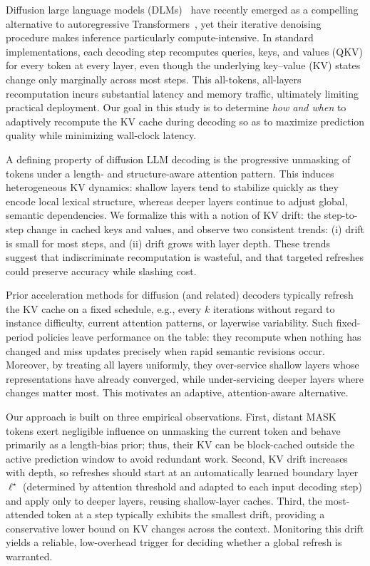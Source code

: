 \documentclass{article} %
\theoremstyle{definition}
\theoremstyle{remark}
\begin{document}
Diffusion large language models (DLMs)~\citep{li2025survey} have recently emerged as a compelling alternative to autoregressive Transformers~\citep{radford2018improving,achiam2023gpt}, yet their iterative denoising procedure makes inference particularly compute-intensive. In standard implementations, each decoding step recomputes queries, keys, and values (QKV) for every token at every layer, even though the underlying key–value (KV) states change only marginally across most steps. This all-tokens, all-layers recomputation incurs substantial latency and memory traffic, ultimately limiting practical deployment. Our goal in this study is to determine {\em how and when} to adaptively recompute the KV cache during decoding so as to maximize prediction quality while minimizing wall-clock latency.

A defining property of diffusion LLM decoding is the progressive unmasking of tokens under a length- and structure-aware attention pattern. This induces heterogeneous KV dynamics: shallow layers tend to stabilize quickly as they encode local lexical structure, whereas deeper layers continue to adjust global, semantic dependencies. We formalize this with a notion of KV drift: the step-to-step change in cached keys and values, and observe two consistent trends: (i) drift is small for most steps, and (ii) drift grows with layer depth. These trends suggest that indiscriminate recomputation is wasteful, and that targeted refreshes could preserve accuracy while slashing cost.

Prior acceleration methods for diffusion (and related) decoders typically refresh the KV cache on a fixed schedule, e.g., every $k$ iterations without regard to instance difficulty, current attention patterns, or layerwise variability. Such fixed-period policies leave performance on the table: they recompute when nothing has changed and miss updates precisely when rapid semantic revisions occur. Moreover, by treating all layers uniformly, they over-service shallow layers whose representations have already converged, while under-servicing deeper layers where changes matter most. This motivates an adaptive, attention-aware alternative.

Our approach is built on three empirical observations. First, distant MASK tokens exert negligible influence on unmasking the current token and behave primarily as a length-bias prior; thus, their KV can be block-cached outside the active prediction window to avoid redundant work. Second, KV drift increases with depth, so refreshes should start at an automatically learned boundary layer $\ell^\star$ ({determined by attention threshold and adapted to each input decoding step})  and apply only to deeper layers, reusing shallow-layer caches. Third, the most-attended token at a step typically exhibits the smallest drift, providing a conservative lower bound on KV changes across the context. Monitoring this drift yields a reliable, low-overhead trigger for deciding whether a global refresh is warranted.
\end{document}
